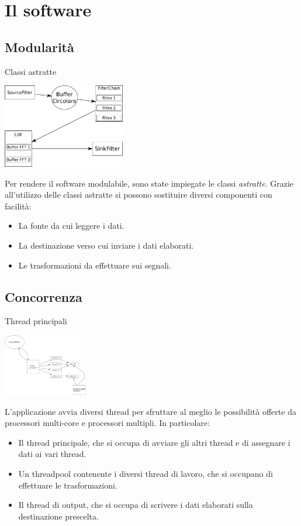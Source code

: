 \documentclass[red]{beamer}
\begin{document}
\section{Il software}
\subsection{Modularità}
\begin{frame}{Classi astratte}
	\begin{center}
		\includegraphics[width=0.4\textwidth]{algorithm}
	\end{center}
	Per rendere il software modulabile, sono state impiegate le classi
	\emph{astratte}. Grazie all'utilizzo delle classi astratte si possono
	sostituire diversi componenti con facilità:\pause
	\begin{itemize}[<+->]
		\item La \alert{fonte} da cui leggere i dati.
		\item La \alert{destinazione} verso cui inviare i dati elaborati.
		\item Le \alert{trasformazioni} da effettuare sui segnali.
	\end{itemize}
\end{frame}
\subsection{Concorrenza}
\begin{frame}{Thread principali}
	\begin{center}
		\includegraphics[height=2.7cm]{threading}
	\end{center}
	L'applicazione avvia diversi thread per sfruttare al meglio le possibilità
	offerte da processori multi-core e processori multipli. In
	particolare:\pause
	\begin{itemize}[<+->]
		\item Il \alert{thread principale}, che si occupa di avviare gli altri
			thread e di assegnare i dati ai vari thread.
		\item Un \alert{threadpool} contenente i diversi thread di lavoro, che
			si occupano di effettuare le trasformazioni.
		\item Il thread di \alert{output}, che si occupa di scrivere i dati
			elaborati sulla destinazione prescelta.
	\end{itemize}
\end{frame}
\end{document}
